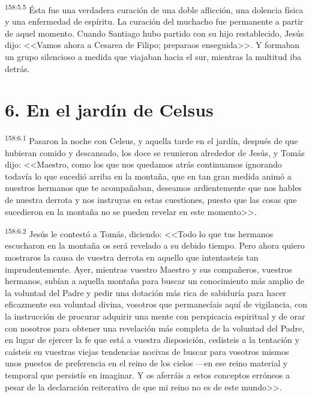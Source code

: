 \par 
\textsuperscript{158:5.5} Ésta fue una verdadera curación de una doble aflicción, una dolencia física y una enfermedad de espíritu. La curación del muchacho fue permanente a partir de aquel momento. Cuando Santiago hubo partido con su hijo restablecido, Jesús dijo: <<Vamos ahora a Cesarea de Filipo; preparaos enseguida>>. Y formaban un grupo silencioso a medida que viajaban hacia el sur, mientras la multitud iba detrás.

\section*{6. En el jardín de Celsus}
\par 
\textsuperscript{158:6.1} Pasaron la noche con Celsus, y aquella tarde en el jardín, después de que hubieran comido y descansado, los doce se reunieron alrededor de Jesús, y Tomás dijo: <<Maestro, como los que nos quedamos atrás continuamos ignorando todavía lo que sucedió arriba en la montaña, que en tan gran medida animó a nuestros hermanos que te acompañaban, deseamos ardientemente que nos hables de nuestra derrota y nos instruyas en estas cuestiones, puesto que las cosas que sucedieron en la montaña no se pueden revelar en este momento>>.

\par 
\textsuperscript{158:6.2} Jesús le contestó a Tomás, diciendo: <<Todo lo que tus hermanos escucharon en la montaña os será revelado a su debido tiempo. Pero ahora quiero mostraros la causa de vuestra derrota en aquello que intentasteis tan imprudentemente. Ayer, mientras vuestro Maestro y sus compañeros, vuestros hermanos, subían a aquella montaña para buscar un conocimiento más amplio de la voluntad del Padre y pedir una dotación más rica de sabiduría para hacer eficazmente esa voluntad divina, vosotros que permanecíais aquí de vigilancia, con la instrucción de procurar adquirir una mente con perspicacia espiritual y de orar con nosotros para obtener una revelación más completa de la voluntad del Padre, en lugar de ejercer la fe que está a vuestra disposición, cedisteis a la tentación y caísteis en vuestras viejas tendencias nocivas de buscar para vosotros mismos unos puestos de preferencia en el reino de los cielos ---en ese reino material y temporal que persistís en imaginar. Y os aferráis a estos conceptos erróneos a pesar de la declaración reiterativa de que mi reino no es de este mundo>>.

